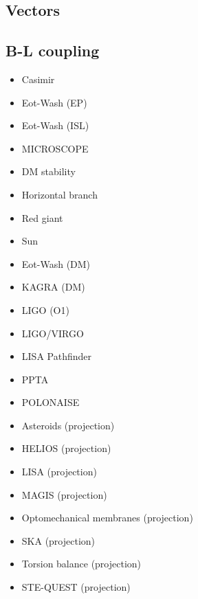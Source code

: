 \documentclass[8pt,twocolumn]{extarticle}
\begin{document}
\begin{mdframed}
\vspace{-1em}
\section{Vectors}\vspace{-0.5em}

\subsection*{B-L coupling}\vspace{-0.5em}
\begin{itemize}\setlength\itemsep{-0.5em}
	\item Casimir~\cite{Bordag:2001qi,Decca:2005qz,Sushkov:2011md}
	\item Eot-Wash (EP)~\cite{Wagner:2012ui}
	\item Eot-Wash (ISL)~\cite{Adelberger:2009zz}
	\item MICROSCOPE~\cite{MICROSCOPE:2022doy}
	\item DM stability~\cite{Chun:2022qcg}
	\item Horizontal branch~\cite{Li:2023vpv}
	\item Red giant~\cite{Li:2023vpv}
	\item Sun~\cite{Li:2023vpv}
	\item Eot-Wash (DM)~\cite{Shaw:2021gnp}
	\item KAGRA (DM)~\cite{KAGRA:2024ipf}
	\item LIGO (O1)~\cite{LIGOScientific:2021ffg}
	\item LIGO/VIRGO~\cite{LIGOScientific:2021ffg}
	\item LISA Pathfinder~\cite{Miller:2023kkd,Frerick:2023aaa}
	\item PPTA~\cite{PPTA:2021uzb}
	\item POLONAISE~\cite{Amaral:2024rbj}
	\item Asteroids (projection)~\cite{Fedderke:2022ptm}
	\item HELIOS (projection)~\cite{Hirschel:2023sbx}
	\item LISA (projection)~\cite{Fedderke:2022ptm}
	\item MAGIS (projection)~\cite{MAGIS}
	\item Optomechanical membranes (projection)~\cite{Manley:2020mjq}
	\item SKA (projection)~\cite{Graham:2015ifn}
	\item Torsion balance (projection)~\cite{Graham:2015ifn}
	\item STE-QUEST (projection)~\cite{Ahlers:2022jdt}
\end{itemize}
\end{mdframed}
\end{document}
